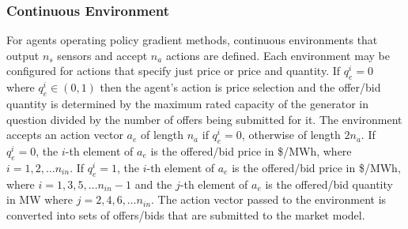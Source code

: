 \subsubsection{Continuous Environment}

For agents operating policy gradient methods, continuous environments that
output $n_s$ sensors and accept $n_a$ actions are defined.  Each environment
may be configured for actions that specify just price or price and quantity.  If
$q_e^i = 0$ where $q_e^i \in (0,1)$ then the agent's action is price selection
and the offer/bid quantity is determined by the maximum rated capacity of the
generator in question divided by the number of offers being submitted for it.
The environment accepts an action vector $a_e$ of length $n_a$ if $q_e^i = 0$,
otherwise of length $2n_a$.  If $q_e^i = 0$, the $i$-th element of $a_e$ is
the offered/bid price in \$/MWh, where $i = 1,2,\dotsc n_{in}$.  If $q_e^i =
1$, the $i$-th element of $a_e$ is the offered/bid price in \$/MWh, where $i =
1,3,5,\dotsc n_{in}-1$ and the $j$-th element of $a_e$ is the offered/bid
quantity in MW where $j = 2,4,6,\dotsc n_{in}$.  The action vector passed to
the environment is converted into sets of offers/bids that are submitted to
the market model.

